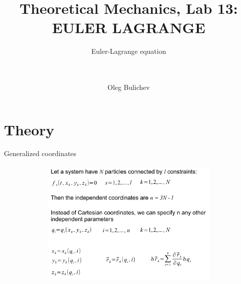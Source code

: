\documentclass[aspectratio=169]{beamer}
\title[Theoretical Mechanics]{Theoretical Mechanics, Lab 13: EULER LAGRANGE} %
\subtitle{Euler-Lagrange equation \\
\  \\ \ } %
\author{Oleg Bulichev}
\newcommand{\fbckg}[1]{\usebackgroundtemplate{\texttt{[image: \#1]}}}%
\begin{document}
\setlength{\abovedisplayskip}{0pt}
\setlength{\belowdisplayskip}{0pt}
\setlength{\abovedisplayshortskip}{0pt}
\setlength{\belowdisplayshortskip}{0pt}

\fbckg{fibeamer/figs/title_page.png}

\fbckg{fibeamer/figs/common.png}


\section*{Theory}

\begin{frame}[t]{Generalized coordinates
    }
\framesubtitle{}
    \vspace{-0.6cm}
    \begin{figure}[H]
        \centering\includegraphics[height=6cm,width=1\textwidth,keepaspectratio]{image21.png}
        \label{fig:image21}
    \end{figure}
\end{frame}
\end{document}
